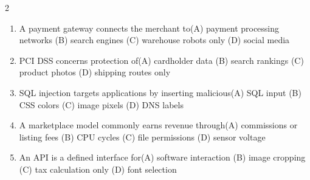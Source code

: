 \documentclass[a4paper]{article}
\begin{document}
\begin{multicols*}{2}
\begin{enumerate}[resume]
\item A payment gateway connects the merchant to\newline\hspace*{0.6em}(A) payment processing networks \quad (B) search engines \newline\hspace*{0.6em}(C) warehouse robots only \quad (D) social media
\item PCI DSS concerns protection of\newline\hspace*{0.6em}(A) cardholder data \quad (B) search rankings \newline\hspace*{0.6em}(C) product photos \quad (D) shipping routes only
\item SQL injection targets applications by inserting malicious\newline\hspace*{0.6em}(A) SQL input \quad (B) CSS colors \newline\hspace*{0.6em}(C) image pixels \quad (D) DNS labels
\item A marketplace model commonly earns revenue through\newline\hspace*{0.6em}(A) commissions or listing fees \quad (B) CPU cycles \newline\hspace*{0.6em}(C) file permissions \quad (D) sensor voltage
\item An API is a defined interface for\newline\hspace*{0.6em}(A) software interaction \quad (B) image cropping \newline\hspace*{0.6em}(C) tax calculation only \quad (D) font selection
\end{enumerate}
\end{multicols*}
\end{document}

